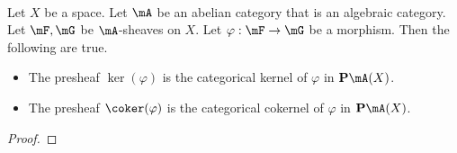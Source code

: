 \documentclass[a4paper]{article}
\begin{document}
\begin{prp}{}{}\\
Let $X$ be a space. Let $\mA$ be an abelian category that is an algebraic category. Let $\mF,\mG$ be $\mA$-sheaves on $X$. Let $\varphi:\mF\to\mG$ be a morphism. Then the following are true. 
\begin{itemize}
\item The presheaf $\ker(\varphi)$ is the categorical kernel of $\varphi$ in $\bold{P}\mA(X)$. 
\item The presheaf $\coker(\varphi)$ is the categorical cokernel of $\varphi$ in $\bold{P}\mA(X)$. 
\end{itemize}
\begin{proof}
\end{proof}
\end{prp}
\end{document}
